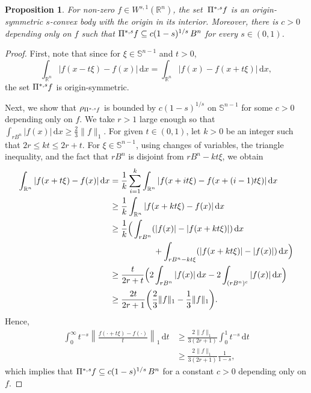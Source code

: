 \documentclass{amsart}
\newtheorem{proposition}[theorem]{Proposition}
\newcommand{\ofpp}[1]{\operatorname{\Pi^{\ast,{\it #1}}}\!}
\newcommand{\Bvtex}{{B^n}}
\newcommand{\snvtex}{{\mathbb S}^{n-1}}
\newcommand{\dvtex}{\,\mathrm{d}}
\begin{document}
\begin{proposition}
\label{prop_Mconvexbody}
For non-zero $f \in W^{s,1}(\mathbb R^{n})$, the set $\,\ofpp{s} f$ is
an origin-symmetric $s$-convex body with the origin in its interior. Moreover,
there is $c>0$ depending only on $f$ such that
$\ofpp{s} f \subseteq c (1-s)^{1/s} \, \Bvtex $ for every $s \in (0,1)$.
\end{proposition}
%
\begin{proof}
First, note that since for $\xi \in \snvtex $ and $t>0$,
%
\begin{equation*}
\int _{\mathbb R^{n}}\vert {f(x -t\xi )-f(x)}\vert \dvtex x=\int _{
\mathbb R^{n}}\vert f(x)-f(x+t\xi )\vert \dvtex x,
\end{equation*}
%
the set $\ofpp{s} f$ is origin-symmetric.

Next, we show that $\rho _{\ofpp{s} f}$ is bounded by
$c (1-s)^{1/s} $ on $\snvtex $ for some $c>0$ depending only on $f$. We take
$r>1$ large enough so that
$\int _{r \Bvtex} \vert f(x)\vert \dvtex x \geq \frac {2}{3} \|f\|_{1}$. For given
$t \in (0,1)$, let $k>0$ be an integer such that
$2r \leq k t \leq 2r+t$. For $\xi \in \snvtex $, using changes of variables,
the triangle inequality, and the fact that $r\Bvtex $ is disjoint from
$r\Bvtex -kt\xi $, we obtain
%
\begin{align*}
\int _{\mathbb R^{n}} |f(x+t\xi ) - f(x)| \dvtex x
&= \frac {1}{k} \sum _{i=1}^{k} \int _{\mathbb R^{n}} |f(x+ i t\xi ) -
f(x+ (i-1)t \xi )| \dvtex x
\\
&\geq \frac {1}{k} \int _{\mathbb R^{n}} |f(x+ k t\xi ) - f(x)| \dvtex x \\
&\geq \frac {1}{k} \Big( \int _{r \Bvtex} (|f(x)| - |f(x+kt\xi )|) \dvtex x
\\
&
\hskip 52pt
+ \int _{r \Bvtex -kt\xi}( |f(x+kt\xi )| - |f(x)|) \dvtex x \Big)
\\
&\geq \frac {t}{2r+t} \Big( 2 \int _{r \Bvtex} |f(x)| \dvtex x - 2\int _{(r
\Bvtex )^{c}} |f(x)| \dvtex x \Big)
\\
&\geq \frac {2t}{2r+1} \biggl( \frac {2}{3} \|f\|_{1} - \frac {1}{3} \|f\|_{1}
\biggr).
\end{align*}
%
Hence,
%
\begin{align}
\int _{0}^{\infty }t^{-s} \left \|\frac{f(\cdot +t\xi )-f(\cdot )}{t}
\right \|_{1} \dvtex t
&\geq \frac {2\|f\|_{1}}{3(2r+1)} \int _{0}^{1} t^{-s} \dvtex t
\nonumber \\
&\geq \frac {2\|f\|_{1}}{3(2r+1)} \frac {1}{1-s},
\nonumber
\end{align}
%
which implies that $\ofpp{s} f \subseteq c(1-s)^{1/s}\, \Bvtex $ for a constant
$c>0$ depending only on $f$.


\end{proof}
\end{document}
